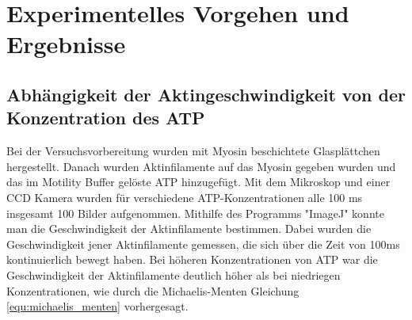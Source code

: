 \section{Experimentelles Vorgehen und Ergebnisse}
\subsection{Abhängigkeit der Aktingeschwindigkeit von der Konzentration des ATP}
Bei der Versuchsvorbereitung wurden mit Myosin beschichtete Glasplättchen hergestellt.
Danach wurden Aktinfilamente auf das Myosin gegeben wurden und das im Motility Buffer gelöste ATP 
hinzugefügt.
Mit dem Mikroskop und einer CCD Kamera wurden für verschiedene ATP-Konzentrationen alle
100 ms insgesamt 100 Bilder aufgenommen. Mithilfe des Programms "ImageJ" konnte man die Geschwindigkeit
der Aktinfilamente bestimmen. Dabei wurden die Geschwindigkeit jener Aktinfilamente gemessen, die
sich über die Zeit von 100ms kontinuierlich bewegt haben. Bei höheren Konzentrationen von ATP war die
Geschwindigkeit der Aktinfilamente deutlich höher als bei niedriegen Konzentrationen,
wie durch die Michaelis-Menten Gleichung \ref{equ:michaelis_menten} vorhergesagt.

